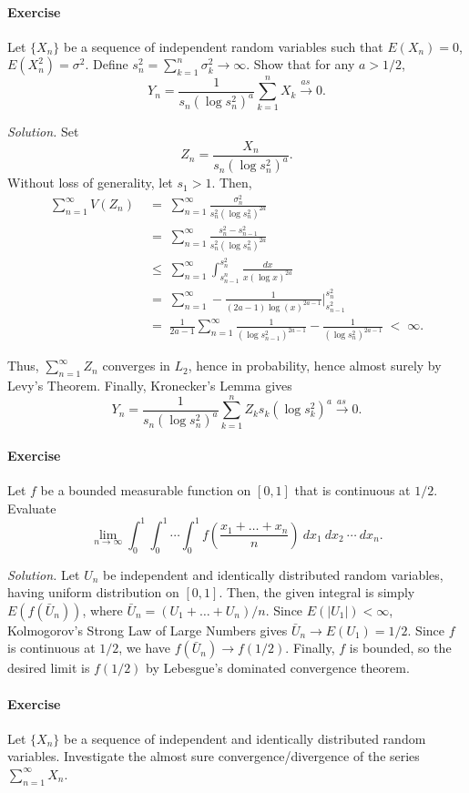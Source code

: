 \documentclass[10pt]{article}
\newcounter{prob}
\newcommand{\problem}{\stepcounter{prob}\paragraph{Exercise \arabic{prob}}}
\newcommand{\solution}{\textit{Solution.} }
\newcommand{\toas}{\overset{as\,}{\longrightarrow}}
\begin{document}
    \problem Let $\{X_n\}$ be a sequence of independent random variables such that
    $E(X_n) = 0$, $E(X_n^2) = \sigma^2$. Define $s_n^2 = \sum_{k = 1}^n \sigma_k^2
    \to \infty$. Show that for any $a > 1/2$, \[
        Y_n = \frac{1}{s_n(\log{s_n^2})^a} \sum_{k = 1}^n X_k \toas 0.
    \]

    \solution Set \[
        Z_n = \frac{X_n}{s_n(\log{s_n^2})^a}.
    \] Without loss of generality, let $s_1 > 1$. Then, \begin{align*}
        \sum_{n = 1}^\infty V(Z_n)
        \;&=\; \sum_{n = 1}^\infty \frac{\sigma_n^2}{s_n^2(\log{s_n^2})^{2a}} \\
        \;&=\; \sum_{n = 1}^\infty \frac{s_n^2 - s_{n -
        1}^2}{s_n^2(\log{s_n^2})^{2a}} \\
        \;&\leq\; \sum_{n = 1}^\infty \int_{s_{n-1}^n}^{s_n^2}
        \frac{dx}{x(\log{x})^{2a}} \\
        \;&=\; \sum_{n = 1}^\infty -\frac{1}{(2a - 1)\log(x)^{2a - 1}}\Big|_{s_{n -
        1}^2}^{s_n^2} \\
        \;&=\; \frac{1}{2a - 1} \sum_{n = 1}^\infty \frac{1}{(\log{s_{n - 1}^2})^{2a
        - 1}} - \frac{1}{(\log{s_n^2})^{2a - 1}} \;<\; \infty.
    \end{align*}

    Thus, $\sum_{n = 1}^\infty Z_n$ converges in $L_2$, hence in probability, hence
    almost surely by Levy's Theorem. Finally, Kronecker's Lemma gives \[
        Y_n = \frac{1}{s_n(\log{s_n^2})^a}\sum_{k = 1}^n Z_k s_k(\log{s_k^2})^a \toas
        0.
    \]


    \problem Let $f$ be a bounded measurable function on $[0, 1]$ that is continuous
    at $1/2$. Evaluate \[
        \lim_{n \to \infty} \int_0^1\int_0^1\cdots\int_0^1 f\left(\frac{x_1 + \dots +
        x_n}{n}\right)\:dx_1\:dx_2\:\cdots\:dx_n.
    \]

    \solution Let $U_n$ be independent and identically distributed random variables,
    having uniform distribution on $[0, 1]$. Then, the given integral is simply
    $E(f(\bar{U}_n))$, where $\bar{U}_n = (U_1 + \dots + U_n) / n$. Since $E(|U_1|) <
    \infty$, Kolmogorov's Strong Law of Large Numbers gives $\bar{U}_n \to E(U_1) =
    1/2$. Since $f$ is continuous at $1/2$, we have $f(\bar{U}_n) \to f(1/2)$.
    Finally, $f$ is bounded, so the desired limit is $f(1/2)$ by Lebesgue's dominated
    convergence theorem.


    \problem Let $\{X_n\}$ be a sequence of independent and identically distributed
    random variables. Investigate the almost sure convergence/divergence of the
    series $\sum_{n = 1}^\infty X_n$.
\end{document}

